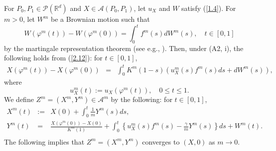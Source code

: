 \documentclass[12pt]{article}
\begin{document}
For $P_0,P_1\in\mathcal{P}(\mathbb{R}^d)$ and $X\in \mathcal{A}(P_0,P_1)$, let $u_X$ and  $W$ satisfy (\ref{1.4}).
For $m>0$, let $W^m$ be a Brownian motion such that 
\begin{equation}\label{2.24.00}
W(\varphi^m(t))-W(\varphi^m(0))=\int_0^t f^m(s)dW^m(s),\quad t\in [0,1]
\end{equation}
by the martingale representation theorem (see e.g., \cite{IW14}).
Then, under (A2, i), the following holds from (\ref{2.12}): for $t\in [0,1]$,
\begin{eqnarray}\label{3.23}
X(\varphi^m(t))-X(\varphi^m(0))
&=&\int_{0}^{t}K^m(1-s)(u_X^m(s)f^m(s)ds +d W^m(s)),\qquad%
\end{eqnarray}
where 
\begin{equation}\label{2.26.00}
u_X^m(t):=u_X(\varphi^m(t)),\quad 0\le t\le 1.
\end{equation}
We define $Z^m=(X^m, Y^m)\in \mathcal{A}^{m}$ by the following: for $t\in [0,1]$,
\begin{eqnarray}
X^m(t)&:=&X(0)+\int_0^t \frac{1}{m}Y^m(s)ds, \label{2.21}\\
Y^m(t)&=&\frac{X(\varphi^m(0))-X(0)}{K^m(1)}
+\int_0^t \left\{u_X^m(s)f^m(s)- \frac{\gamma}{m}Y^m(s)\right\}ds+W^m(t).\nonumber\\
\label{2.24}
\end{eqnarray}
The following implies that $Z^m=(X^m, Y^m)$ converges to $(X, 0)$ as $m\to 0$.
\end{document}
